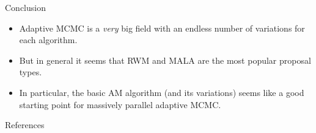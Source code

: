 \documentclass[aspectratio=169]{beamer}
\begin{document}
\begin{frame}{Conclusion}
    \begin{itemize}[<+->]
        \item Adaptive MCMC is a \textit{very} big field with an endless number of variations for each algorithm.
        \item But in general it seems that RWM and MALA are the most popular proposal types.
        \item In particular, the basic AM algorithm (and its variations) seems like a good starting point for massively parallel adaptive MCMC.
    \end{itemize}
\end{frame}

\begin{frame}[allowframebreaks]{References}
    \printbibliography
\end{frame}
\end{document}
